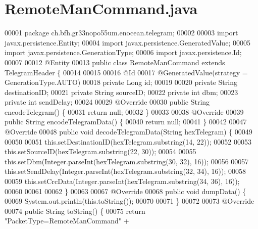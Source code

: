 \section{Remote\+Man\+Command.\+java}
\label{RemoteManCommand_8java_source}

\begin{DoxyCode}
00001 \textcolor{keyword}{package }ch.bfh.gr33nopo55um.enocean.telegram;
00002 
00003 \textcolor{keyword}{import} javax.persistence.Entity;
00004 \textcolor{keyword}{import} javax.persistence.GeneratedValue;
00005 \textcolor{keyword}{import} javax.persistence.GenerationType;
00006 \textcolor{keyword}{import} javax.persistence.Id;
00007 
00012 @Entity
00013 \textcolor{keyword}{public} \textcolor{keyword}{class }RemoteManCommand \textcolor{keyword}{extends} TelegramHeader \{
00014 
00015 
00016     @Id
00017     @GeneratedValue(strategy = GenerationType.AUTO)
00018     private Long \textcolor{keywordtype}{id};
00019 
00020     private String destinationID;
00021     private String sourceID;
00022     private \textcolor{keywordtype}{int} dbm;
00023     private \textcolor{keywordtype}{int} sendDelay;
00024 
00029     @Override
00030     public String encodeTelegram() \{
00031         \textcolor{keywordflow}{return} null;
00032     \}
00033 
00038     @Override
00039     \textcolor{keyword}{public} String encodeTelegramData() \{
00040         \textcolor{keywordflow}{return} null;
00041     \}
00042 
00047     @Override
00048     \textcolor{keyword}{public} \textcolor{keywordtype}{void} decodeTelegramData(String hexTelegram) \{
00049 
00050 
00051         this.setDestinationID(hexTelegram.substring(14, 22));
00052 
00053         this.setSourceID(hexTelegram.substring(22, 30));
00054 
00055         this.setDbm(Integer.parseInt(hexTelegram.substring(30, 32), 16));
00056 
00057         this.setSendDelay(Integer.parseInt(hexTelegram.substring(32, 34), 16));
00058 
00059         this.setCrcData(Integer.parseInt(hexTelegram.substring(34, 36), 16));
00060 
00061 
00062     \}
00063 
00067     @Override
00068     \textcolor{keyword}{public} \textcolor{keywordtype}{void} dumpData() \{
00069         System.out.println(this.toString());
00070 
00071     \}
00072 
00073     @Override
00074     \textcolor{keyword}{public} String toString() \{
00075         \textcolor{keywordflow}{return} \textcolor{stringliteral}{"PacketType=RemoteManCommand"} +

\end{DoxyCode}
